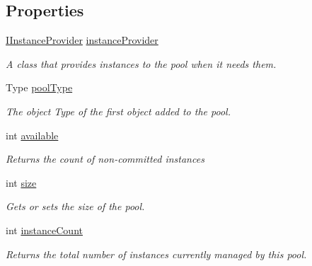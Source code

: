 \subsection*{Properties}
\begin{DoxyCompactItemize}
\item 
\hyperlink{interfacestrange_1_1framework_1_1api_1_1_i_instance_provider}{I\-Instance\-Provider} \hyperlink{interfacestrange_1_1extensions_1_1pool_1_1api_1_1_i_pool_ada91aed79f4e553ceca25ef52427782c}{instance\-Provider}
\begin{DoxyCompactList}\small\item\em A class that provides instances to the pool when it needs them. \end{DoxyCompactList}\item 
Type \hyperlink{interfacestrange_1_1extensions_1_1pool_1_1api_1_1_i_pool_ab967eecf4fc76c5716cad1493d74d295}{pool\-Type}
\begin{DoxyCompactList}\small\item\em The object Type of the first object added to the pool. \end{DoxyCompactList}\item 
int \hyperlink{interfacestrange_1_1extensions_1_1pool_1_1api_1_1_i_pool_a0ad2b0ade39b7af713a0dfc3ddaec7bf}{available}
\begin{DoxyCompactList}\small\item\em Returns the count of non-\/committed instances \end{DoxyCompactList}\item 
int \hyperlink{interfacestrange_1_1extensions_1_1pool_1_1api_1_1_i_pool_a89338069d9bf986689ceec24341fab3a}{size}
\begin{DoxyCompactList}\small\item\em Gets or sets the size of the pool. \end{DoxyCompactList}\item 
int \hyperlink{interfacestrange_1_1extensions_1_1pool_1_1api_1_1_i_pool_a64c22a4f15d41fe5f4109ac5f6d2df58}{instance\-Count}
\begin{DoxyCompactList}\small\item\em Returns the total number of instances currently managed by this pool. \end{DoxyCompactList}\item 

\end{DoxyCompactItemize}
